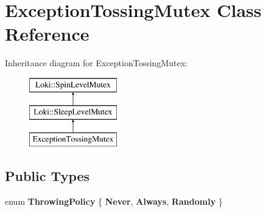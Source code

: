 \hypertarget{classExceptionTossingMutex}{}\section{Exception\+Tossing\+Mutex Class Reference}
\label{classExceptionTossingMutex}
Inheritance diagram for Exception\+Tossing\+Mutex\+:\begin{figure}[H]
\begin{center}
\leavevmode
\includegraphics[height=3.000000cm]{classExceptionTossingMutex}
\end{center}
\end{figure}
\subsection*{Public Types}
\begin{DoxyCompactItemize}
\item 
\hypertarget{classExceptionTossingMutex_aa2f55803254cfa2b1ed08c8f19a1b5af}{}enum {\bfseries Throwing\+Policy} \{ {\bfseries Never}, 
{\bfseries Always}, 
{\bfseries Randomly}
 \}\label{classExceptionTossingMutex_aa2f55803254cfa2b1ed08c8f19a1b5af}

\end{DoxyCompactItemize}
